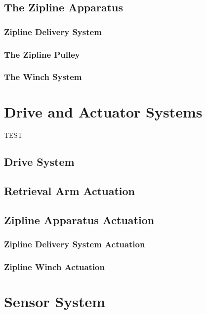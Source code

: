 \documentclass[11pt, oneside]{article} %
\begin{document}
	\subsection{The Zipline Apparatus}
		\subsubsection{Zipline Delivery System}
	
		\subsubsection{The Zipline Pulley}
	
		\subsubsection{The Winch System}

\section{Drive and Actuator Systems}


TEST
	\subsection{Drive System}
	
	\subsection{Retrieval Arm Actuation}
	
	\subsection{Zipline Apparatus Actuation}
	
		\subsubsection{Zipline Delivery System Actuation}
		
		\subsubsection{Zipline Winch Actuation}



\section{Sensor System}
	
\end{document}
